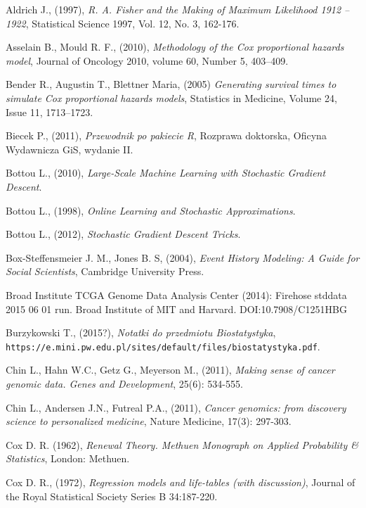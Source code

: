 \begin{thebibliography}{99}

 Aldrich J., (1997), \textit{R. A. Fisher and the Making of Maximum Likelihood 1912 – 1922}, Statistical Science 1997, Vol. 12, No. 3, 162-176.

 Asselain B., Mould R. F., (2010), \textit{Methodology of the Cox proportional hazards model},  Journal of Oncology 2010, volume 60, Number 5,  403–409.

 Bender R., Augustin T., Blettner Maria, (2005) \textit{Generating survival times to simulate Cox proportional hazards models}, Statistics in Medicine, Volume 24, Issue 11, 1713–1723.

 Biecek P., (2011), \textit{Przewodnik po pakiecie R}, Rozprawa doktorska, Oficyna Wydawnicza GiS, wydanie II.

 Bottou L., (2010), \textit{Large-Scale Machine Learning with Stochastic Gradient Descent}.

 Bottou L., (1998), \textit{Online Learning and Stochastic Approximations}.

 Bottou L., (2012), \textit{Stochastic Gradient Descent Tricks}.

 Box-Steffensmeier J. M., Jones B. S, (2004), \textit{Event History Modeling: A Guide for Social Scientists}, Cambridge University Press.


 Broad Institute TCGA Genome Data Analysis Center (2014): Firehose stddata 2015 06 01 run. Broad Institute of MIT and Harvard. DOI:10.7908/C1251HBG

 Burzykowski T., (2015?), \textit{Notatki do przedmiotu Biostatystyka}, \texttt{https://e.mini.pw.edu.pl/sites/default/files/biostatystyka.pdf}.

 Chin L., Hahn W.C., Getz G., Meyerson M., (2011), \textit{Making sense of cancer genomic data. Genes and Development}, 25(6): 534-555.

 Chin L., Andersen J.N., Futreal P.A., (2011), \textit{Cancer genomics: from discovery science to personalized medicine}, Nature Medicine, 17(3): 297-303.

 Cox D. R. (1962), \textit{Renewal Theory. Methuen Monograph on Applied Probability
\& Statistics}, London: Methuen.

  Cox D. R., (1972), \textit{Regression models and life-tables (with discussion)}, Journal of the Royal Statistical Society Series B 34:187-220.



\end{thebibliography}
